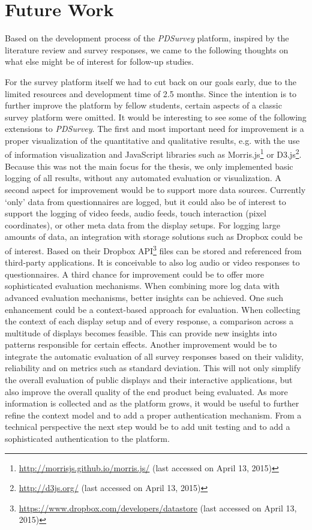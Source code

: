 \section{Future Work}
\label{chapter:future-work}


Based on the development process of the \textit{PDSurvey} platform, inspired by the literature review and survey responses, we came to the following thoughts on what else might be of interest for follow-up studies.


For the survey platform itself we had to cut back on our goals early, due to the limited resources and development time of 2.5 months. Since the intention is to further improve the platform by fellow students, certain aspects of a classic survey platform were omitted. It would be interesting to see some of the following extensions to \textit{PDSurvey}.
The first and most important need for improvement is a proper visualization of the quantitative and qualitative results, e.g. with the use of information visualization and JavaScript libraries such as Morris.js\footnote{\url{http://morrisjs.github.io/morris.js/} (last accessed on April 13, 2015)} or D3.js\footnote{\url{http://d3js.org/} (last accessed on April 13, 2015)}. Because this was not the main focus for the thesis, we only implemented basic logging of all results, without any automated evaluation or visualization.
A second aspect for improvement would be to support more data sources. Currently `only' data from questionnaires are logged, but it could also be of interest to support the logging of video feeds, audio feeds, touch interaction (pixel coordinates), or other meta data from the display setups. For logging large amounts of data, an integration with storage solutions such as Dropbox could be of interest. Based on their Dropbox API\footnote{\url{https://www.dropbox.com/developers/datastore} (last accessed on April 13, 2015)} files can be stored and referenced from third-party applications. It is conceivable to also log audio or video responses to questionnaires.
A third chance for improvement could be to offer more sophisticated evaluation mechanisms. When combining more log data with advanced evaluation mechanisms, better insights can be achieved. One such enhancement could be a context-based approach for evaluation. When collecting the context of each display setup and of every response, a comparison across a multitude of displays becomes feasible. This can provide new insights into patterns responsible for certain effects. Another improvement would be to integrate the automatic evaluation of all survey responses based on their validity, reliability and on metrics such as standard deviation. This will not only simplify the overall evaluation of public displays and their interactive applications, but also improve the overall quality of the end product being evaluated.
As more information is collected and as the platform grows, it would be useful to further refine the context model and to add a proper authentication mechanism. From a technical perspective the next step would be to add unit testing and to add a sophisticated authentication to the platform.



